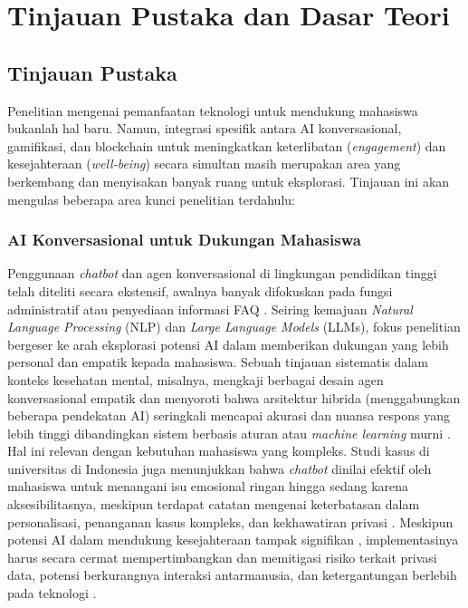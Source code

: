 \chapter{Tinjauan Pustaka dan Dasar Teori}
\label{ch:tinjpust_dasar_teori}

\section{Tinjauan Pustaka}
\label{sec:tinjauan_pustaka}

Penelitian mengenai pemanfaatan teknologi untuk mendukung mahasiswa bukanlah hal baru. Namun, integrasi spesifik antara AI konversasional, gamifikasi, dan blockchain untuk meningkatkan keterlibatan (\textit{engagement}) dan kesejahteraan (\textit{well-being}) secara simultan masih merupakan area yang berkembang dan menyisakan banyak ruang untuk eksplorasi. Tinjauan ini akan mengulas beberapa area kunci penelitian terdahulu:

\subsection{AI Konversasional untuk Dukungan Mahasiswa} 
\label{subsec:ai_konversasional}

Penggunaan \textit{chatbot} dan agen konversasional di lingkungan pendidikan tinggi telah diteliti secara ekstensif, awalnya banyak difokuskan pada fungsi administratif atau penyediaan informasi FAQ \cite{ai_chatbots_education_advances_2024}. Seiring kemajuan \textit{Natural Language Processing} (NLP) dan \textit{Large Language Models} (LLMs), fokus penelitian bergeser ke arah eksplorasi potensi AI dalam memberikan dukungan yang lebih personal dan empatik kepada mahasiswa. Sebuah tinjauan sistematis dalam konteks kesehatan mental, misalnya, mengkaji berbagai desain agen konversasional empatik dan menyoroti bahwa arsitektur hibrida (menggabungkan beberapa pendekatan AI) seringkali mencapai akurasi dan nuansa respons yang lebih tinggi dibandingkan sistem berbasis aturan atau \textit{machine learning} murni \cite{empathetic_conversational_agents_mental_health_2024}. Hal ini relevan dengan kebutuhan mahasiswa yang kompleks. Studi kasus di universitas di Indonesia juga menunjukkan bahwa \textit{chatbot} dinilai efektif oleh mahasiswa untuk menangani isu emosional ringan hingga sedang karena aksesibilitasnya, meskipun terdapat catatan mengenai keterbatasan dalam personalisasi, penanganan kasus kompleks, dan kekhawatiran privasi \cite{chatbot_student_mental_health_unuja}. Meskipun potensi AI dalam mendukung kesejahteraan tampak signifikan \cite{ai_effects_student_wellbeing_2025}, implementasinya harus secara cermat mempertimbangkan dan memitigasi risiko terkait privasi data, potensi berkurangnya interaksi antarmanusia, dan ketergantungan berlebih pada teknologi \cite{ai_effects_student_wellbeing_2025, empathetic_conversational_agents_mental_health_2024}.

